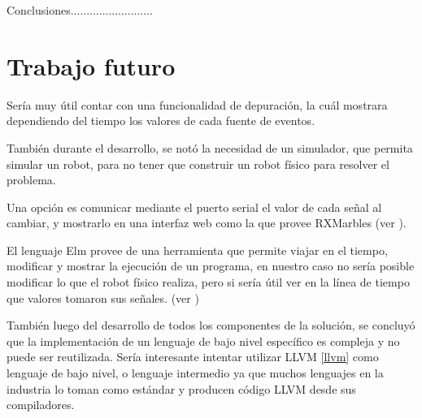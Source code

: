 

  Conclusiones..........................

\section{Trabajo futuro}

  Sería muy útil contar con una funcionalidad de depuración, la cuál
mostrara dependiendo del tiempo los valores de cada fuente de eventos.

  También durante el desarrollo, se notó la necesidad de un simulador,
que permita simular un robot, para no tener que construir un robot
físico para resolver el problema.

Una opción es comunicar mediante el puerto serial el valor de cada
señal al cambiar, y mostrarlo en una interfaz web como la que provee
RXMarbles (ver \cite{rxmarbles}). 

El lenguaje Elm provee de una herramienta que permite viajar en el 
tiempo, modificar y mostrar la ejecución de un programa, en nuestro
caso no sería posible modificar lo que el robot físico realiza, pero
si sería útil ver en la línea de tiempo que valores tomaron sus
señales. (ver \cite{elmdebug})

  También luego del desarrollo de todos los componentes de la solución,
se concluyó que la implementación de un lenguaje de bajo nivel específico
es compleja y no puede ser reutilizada.
  Sería interesante intentar utilizar LLVM \ref{llvm} como lenguaje de
bajo nivel, o lenguaje intermedio ya que muchos lenguajes en la 
industria lo toman como estándar y producen código LLVM desde sus
compiladores.
